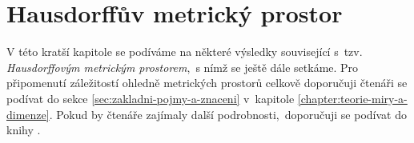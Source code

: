 \chapter{Hausdorffův metrický prostor}\label{chapter:hausdorffuv-mp}

V této kratší kapitole se podíváme na některé výsledky související s~tzv. \emph{Hausdorffovým metrickým prostorem},~s nímž se ještě dále setkáme. Pro připomenutí záležitostí ohledně metrických prostorů celkově doporučuji čtenáři se podívat do sekce \ref{sec:zakladni-pojmy-a-znaceni} v~kapitole \ref{chapter:teorie-miry-a-dimenze}. Pokud by čtenáře zajímaly další podrobnosti,~doporučuji se podívat do knihy \citep[str. 71]{Edgar2008}.

